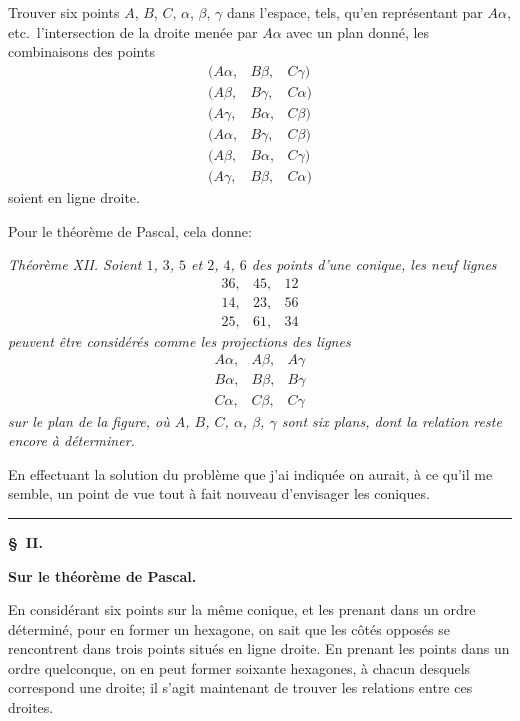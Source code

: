 \documentclass[12pt,a4paper]{article}
\theoremstyle{plain}
\begin{document}
Trouver six points $A$, $B$, $C$, $\alpha$, $\beta$, $\gamma$ dans l'espace, tels, qu'en repr\'esentant par $A\alpha$, etc.\ l'intersection de la droite men\'ee par $A\alpha$ avec un plan donn\'e, les combinaisons des points
\[
\begin{array}{ccc}
(A\alpha, & B\beta, & C\gamma) \\
(A\beta, & B\gamma, & C\alpha) \\
(A\gamma, & B\alpha, & C\beta) \\
(A\alpha, & B\gamma, & C\beta) \\
(A\beta, & B\alpha, & C\gamma) \\
(A\gamma, & B\beta, & C\alpha)
\end{array}
\]
soient en ligne droite.

Pour le th\'eor\`eme de Pascal, cela donne:

\smallskip
\textit{Th\'eor\`eme XII. Soient $1$, $3$, $5$ et $2$, $4$, $6$ des points d'une conique, les neuf lignes
\[
\begin{array}{ccc}
36, & 45, & 12 \\
14, & 23, & 56 \\
25, & 61, & 34
\end{array}
\]
peuvent \^etre consid\'er\'es comme les projections des lignes
\[
\begin{array}{ccc}
A\alpha, & A\beta, & A\gamma \\
B\alpha, & B\beta, & B\gamma \\
C\alpha, & C\beta, & C\gamma
\end{array}
\]
sur le plan de la figure, o\`u $A$, $B$, $C$, $\alpha$, $\beta$, $\gamma$ sont six plans, dont la relation reste encore \`a d\'eterminer.}
\smallskip

En effectuant la solution du probl\`eme que j'ai indiqu\'ee on aurait, \`a ce qu'il me semble, un point de vue tout \`a fait nouveau d'envisager les coniques.

\medskip
\hrule
\medskip

\textbf{\S\ II.}

\begin{center}\textbf{Sur le th\'eor\`eme de Pascal.}\end{center}

En consid\'erant six points sur la m\^eme conique, et les prenant dans un ordre d\'etermin\'e, pour en former un hexagone, on sait que les c\^ot\'es oppos\'es se rencontrent dans trois points situ\'es en ligne droite. En prenant les points dans un ordre quelconque, on en peut former soixante hexagones, \`a chacun desquels correspond une droite; il s'agit maintenant de trouver les relations entre ces droites.
\end{document}
